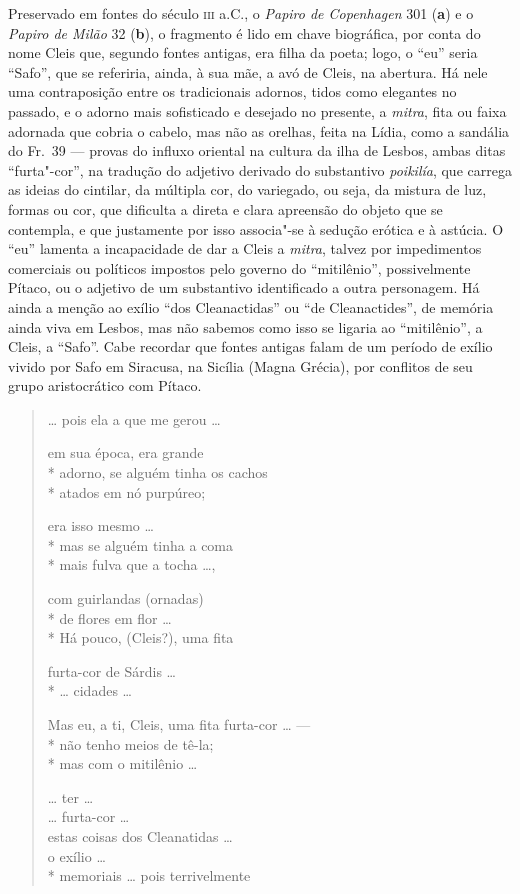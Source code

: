 {\small Preservado em fontes do século \textsc{iii} a.C., o \textit{Papiro de Copenhagen} 301 (\textbf{a}) e o \textit{Papiro de Milão} 32 (\textbf{b}),
o fragmento é lido em chave biográfica, por conta do
nome Cleis que, segundo fontes antigas, era filha da poeta; logo, o “eu” seria
``Safo”, que se referiria, ainda, à sua mãe, a avó de Cleis, na
abertura. Há nele uma contraposição entre os tradicionais adornos, tidos como		\EP[]
elegantes no passado, e o adorno mais sofisticado e desejado no presente, a
\textit{mitra}, fita ou faixa adornada que cobria o cabelo, mas não as orelhas,
feita na Lídia, como a sandália do Fr.~39 --- provas do influxo oriental na
cultura da ilha de Lesbos, ambas ditas ``furta"-cor”, na tradução do
adjetivo derivado do substantivo \textit{poikilía}, que carrega as ideias do
cintilar, da múltipla cor, do variegado, ou seja, da mistura de luz, formas ou
cor, que dificulta a direta e clara apreensão do objeto que se contempla, e que
justamente por isso associa"-se à sedução erótica e à astúcia. O “eu” lamenta a
incapacidade de dar a Cleis a \textit{mitra}, talvez por impedimentos
comerciais ou políticos impostos pelo governo do “mitilênio”, possivelmente
Pítaco, ou o adjetivo de um substantivo identificado a outra personagem. Há
ainda a menção ao exílio “dos Cleanactidas” ou “de Cleanactides”, de memória
ainda viva em Lesbos, mas não sabemos como isso se ligaria ao
“mitilênio”, a Cleis, a ``Safo”. Cabe recordar que fontes antigas falam
de um período de exílio vivido por Safo em Siracusa, na Sicília (Magna Grécia),
por conflitos de seu grupo aristocrático com Pítaco.}

\begin{verse}
\ldots{} pois ela a que me gerou \ldots{}


em sua época, era grande \\*
adorno, se alguém tinha os cachos\\*
atados em nó purpúreo;


era isso mesmo \ldots{} \\*
mas se alguém tinha a coma\\*
mais fulva que a tocha \ldots{},

com guirlandas (ornadas)\\*
de flores em flor \ldots{}\\*
Há pouco, (Cleis?), uma fita

furta-cor de Sárdis \ldots{}\\*
\ldots{} cidades \ldots{}

Mas eu, a ti, Cleis, uma fita furta-cor \ldots{} ---\\*
não tenho meios de tê-la; \\*
mas com o mitilênio \ldots{}

\ast\quad\ast\quad\ast

\ldots{} ter \ldots{}\\
\ldots{} furta-cor \ldots{}\\
estas coisas dos Cleanatidas \ldots{}\\
o exílio \ldots{}\\*
memoriais \ldots{} pois terrivelmente 
\end{verse}

